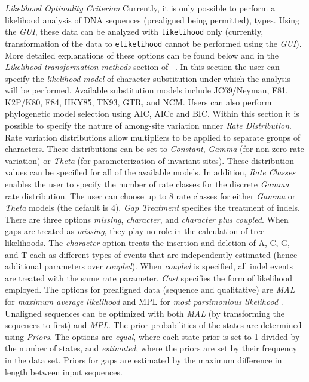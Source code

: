 \hangindent=1cm  \emph{Likelihood Optimality Criterion} Currently,
it is only possible to perform a likelihood analysis of DNA sequences
(prealigned being permitted), %
types. Using the \emph{GUI}, these data can be analyzed with
\texttt{likelihood} only (currently, transformation of the data to
\texttt{elikelihood} cannot be performed using the \emph{GUI}).
More detailed explanations of these options can be found below and
in the \emph{Likelihood transformation methods} section of
~.  In this section the user can specify the
\emph{likelihood model} of character substitution under which the
analysis will be performed.  Available substitution models include
JC69/Neyman, F81, K2P/K80, F84, HKY85, TN93, GTR, and NCM.  Users
can also perform phylogenetic model selection using AIC, AICc and
BIC.  Within this section it is possible to specify the nature of
among-site variation under \emph{Rate Distribution}.  Rate variation
distributions allow multipliers to be applied to separate groups
of characters.  These distributions can be set to \emph{Constant},
\emph{Gamma} (for non-zero rate variation) or  \emph{Theta} (for
parameterization of invariant sites).  These distribution values
can be specified for all of the available models. In addition,
\emph{Rate Classes} enables the user to specify the number of rate
classes for the discrete \emph{Gamma} rate distribution.  The user
can choose up to 8 rate classes for either \emph{Gamma} or \emph{Theta}
models (the default is 4).  \emph{Gap Treatment}  specifies the
treatment of indels.  There are three options \emph{missing},
\emph{character}, and \emph{character plus coupled}.  When gaps are
treated as \emph{missing}, they play no role in the calculation of
tree likelihoods.  The \emph{character} option treats the insertion
and deletion of A, C, G, and T each as different types of events
that are independently estimated (hence additional parameters over
\emph{coupled}). When \emph{coupled} is specified, all indel events
are treated with the same rate parameter.  \emph{Cost} specifies
the form of likelihood employed.  The options for prealigned data
(sequence and qualitative) are \emph{MAL} for \emph{maximum average
likelihood} and {MPL} for \emph{most parsimonious likelihood}
\cite{barryandhartigan1987}. Unaligned sequences can be optimized
with both \emph{MAL} (by transforming the sequences to
 first) and \emph{MPL}.  The prior
probabilities of the states are determined using \emph{Priors}.
The options are \emph{equal}, where each state prior is set to 1
divided by the number of states, and \emph{estimated}, where the
priors are set by their frequency in the data set.  Priors for gaps
are estimated by the maximum difference in length between input
sequences.

